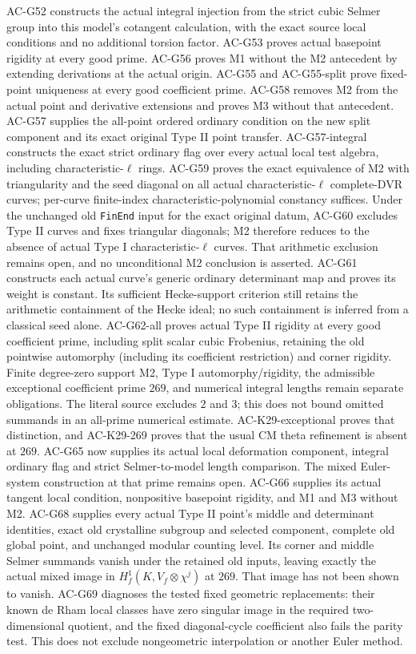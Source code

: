 \documentclass[11pt,a4paper]{article}
\theoremstyle{definition}
\theoremstyle{remark}
\begin{document}
AC-G52 constructs the actual integral injection from the strict cubic
Selmer group into this model's cotangent calculation, with the exact
source local conditions and no additional torsion factor. AC-G53 proves actual basepoint rigidity at every good prime.
AC-G56 proves M1 without the M2 antecedent by extending derivations at
the actual origin. AC-G55 and AC-G55-split prove fixed-point uniqueness
at every good coefficient prime. AC-G58 removes M2 from the actual
point and derivative extensions and proves M3 without that antecedent.
AC-G57 supplies the all-point ordered ordinary condition on the new
split component and its exact original Type II point transfer.
AC-G57-integral constructs the exact strict ordinary flag over every
actual local test algebra, including characteristic-$\ell$ rings.
AC-G59 proves the exact equivalence of M2 with triangularity and the
seed diagonal on all actual characteristic-$\ell$ complete-DVR curves;
per-curve finite-index characteristic-polynomial constancy suffices.
Under the unchanged old \texttt{FinEnd} input for the exact original
datum, AC-G60 excludes Type II curves and fixes triangular diagonals;
M2 therefore reduces to the absence of actual Type I
characteristic-$\ell$ curves. That arithmetic exclusion remains open,
and no unconditional M2 conclusion is asserted.
AC-G61 constructs each actual curve's generic ordinary determinant map
and proves its weight is constant. Its sufficient Hecke-support criterion
still retains the arithmetic containment of the Hecke ideal; no such
containment is inferred from a classical seed alone.
AC-G62-all proves actual Type II rigidity at every good coefficient
prime, including split scalar cubic Frobenius, retaining the old
pointwise automorphy (including its coefficient restriction) and corner
rigidity. Finite degree-zero support M2, Type I automorphy/rigidity,
the admissible exceptional coefficient prime $269$, and numerical
integral lengths remain separate obligations. The literal source excludes
$2$ and $3$; this does not bound omitted summands in an all-prime
numerical estimate. AC-K29-exceptional proves that distinction, and
AC-K29-269 proves that the usual CM theta refinement is absent at $269$.
AC-G65 now supplies its actual local deformation component, integral
ordinary flag and strict Selmer-to-model length comparison. The mixed
Euler-system construction at that prime remains open. AC-G66 supplies
its actual tangent local condition, nonpositive basepoint rigidity,
and M1 and M3 without M2. AC-G68 supplies every actual Type II
point's middle and determinant identities, exact old crystalline
subgroup and selected component, complete old global point, and
unchanged modular counting level. Its corner and middle Selmer
summands vanish under the retained old inputs, leaving exactly the
actual mixed image in $H_f^1(K,V_f\otimes\chi^j)$ at $269$.
That image has not been shown to vanish. AC-G69 diagnoses the tested
fixed geometric replacements: their known de Rham local classes
have zero singular image in the required two-dimensional quotient,
and the fixed diagonal-cycle coefficient also fails the parity test.
This does not exclude nongeometric interpolation or another Euler method.
\end{document}
